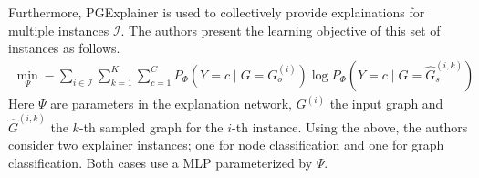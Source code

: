 Furthermore, PGExplainer is used to collectively provide explainations for multiple instances $\mathcal{I}$. The authors present the learning objective of this set of instances as follows.
\begin{align}
    \min _{\Psi}-\sum_{i \in \mathcal{I}} \sum_{k=1}^{K} \sum_{c=1}^{C} P_{\Phi}\left(Y=c \mid G=G_{o}^{(i)}\right) \log P_{\Phi}\left(Y=c \mid G=\hat{G}_{s}^{(i, k)}\right)
\end{align}
Here $\Psi$ are parameters in the explanation network, $G^{(i)}$ the input graph and $\hat{G}^{(i, k)}$ the $k$-th sampled graph for the $i$-th instance.
Using the above, the authors consider two explainer instances; one for node classification and one for graph classification. Both cases use a MLP parameterized by $\Psi$.






